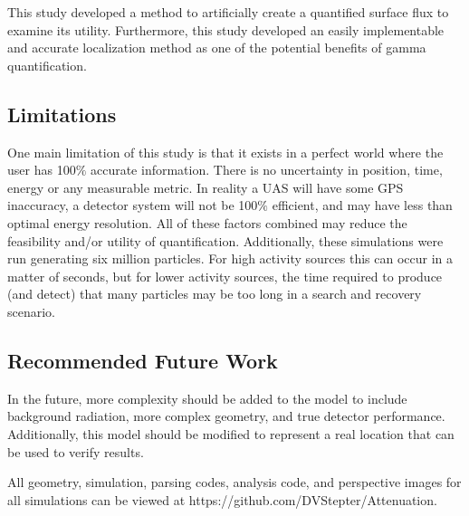 \noindent This study developed a method to artificially create a quantified surface flux to examine its utility. Furthermore, this study developed an easily implementable and accurate localization method as one of the potential benefits of gamma quantification.

\subsection{Limitations}
\noindent One main limitation of this study is that it exists in a perfect world where the user has 100$\%$ accurate information. There is no uncertainty in position, time, energy or any measurable metric. In reality a UAS will have some GPS inaccuracy, a detector system will not be 100$\%$ efficient, and may have less than optimal energy resolution. All of these factors combined may reduce the feasibility and/or utility of quantification. Additionally, these simulations were run generating six million particles. For high activity sources this can occur in a matter of seconds, but for lower activity sources, the time required to produce (and detect) that many particles may be too long in a search and recovery scenario.

\subsection{Recommended Future Work}
\noindent In the future, more complexity should be added to the model to include background radiation, more complex geometry, and true detector performance. Additionally, this model should be modified to represent a real location that can be used to verify results.

All geometry, simulation, parsing codes, analysis code, and perspective images for all simulations can be viewed at https://github.com/DVStepter/Attenuation.
